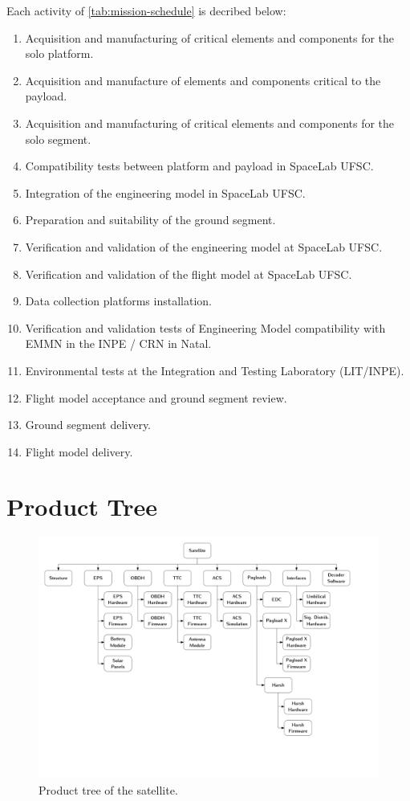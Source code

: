 Each activity of \autoref{tab:mission-schedule} is decribed below:

\begin{enumerate}
    \item Acquisition and manufacturing of critical elements and components for the solo platform.
    \item Acquisition and manufacture of elements and components critical to the payload.
    \item Acquisition and manufacturing of critical elements and components for the solo segment.
    \item Compatibility tests between platform and payload in SpaceLab UFSC.
    \item Integration of the engineering model in SpaceLab UFSC.
    \item Preparation and suitability of the ground segment.
    \item Verification and validation of the engineering model at SpaceLab UFSC.
    \item Verification and validation of the flight model at SpaceLab UFSC.
    \item Data collection platforms installation.
    \item Verification and validation tests of Engineering Model compatibility with EMMN in the INPE / CRN in Natal.
    \item Environmental tests at the Integration and Testing Laboratory (LIT/INPE).
    \item Flight model acceptance and ground segment review.
    \item Ground segment delivery.
    \item Flight model delivery.
\end{enumerate}

\section{Product Tree}

\begin{figure}[!ht]
    \begin{center}
        \includegraphics[width=\textwidth]{figures/product-tree.pdf}
        \caption{Product tree of the satellite.}
        \label{fig:product-tree}
    \end{center}
\end{figure}

